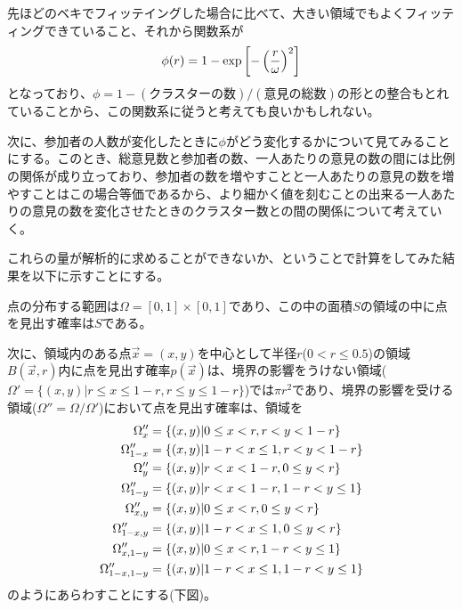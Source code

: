 \documentclass[letterpaper,10pt,english]{sphinxmanual}
\begin{document}
先ほどのベキでフィッテイングした場合に比べて、大きい領域でもよくフィッティングできていること、それから関数系が
\begin{gather}
\begin{split}\phi (r) = 1 - \exp \left[ -  \left( \frac{r}{\omega} \right)^{2} \right]\end{split}\notag
\end{gather}
となっており、\(\phi = 1- (\text{クラスターの数})/(\text{意見の総数})\)の形との整合もとれていることから、この関数系に従うと考えても良いかもしれない。

次に、参加者の人数が変化したときに\(\phi\)がどう変化するかについて見てみることにする。このとき、総意見数と参加者の数、一人あたりの意見の数の間には比例の関係が成り立っており、参加者の数を増やすことと一人あたりの意見の数を増やすことはこの場合等価であるから、より細かく値を刻むことの出来る一人あたりの意見の数を変化させたときのクラスター数との間の関係について考えていく。

これらの量が解析的に求めることができないか、ということで計算をしてみた結果を以下に示すことにする。

点の分布する範囲は\(\Omega = [0,1]\times [0,1]\)であり、この中の面積\(S\)の領域の中に点を見出す確率は\(S\)である。

次に、領域内のある点\(\vec x=(x,y)\)を中心として半径\(r\)(\(0 < r \le 0.5\))の領域\(B(\vec x, r)\)内に点を見出す確率\(p(\vec x)\)は、境界の影響をうけない領域(\(\Omega ' = \{(x,y) | r \le x \le 1-r, r \le y \le 1-r \}\))では\(\pi r^{2}\)であり、境界の影響を受ける領域(\(\Omega'' = \Omega / \Omega'\))において点を見出す確率は、領域を
\begin{gather}
\begin{split}\begin{align}
\Omega''_{x} &= \{(x,y) | 0 \le x < r, r< y < 1-r\} \\
\Omega''_{1-x} &= \{(x,y) | 1-r < x \le 1, r< y < 1-r\} \\
\Omega''_{y} &= \{(x,y) | r < x < 1-r, 0 \le y < r\} \\
\Omega''_{1-y} &= \{(x,y) | r < x < 1-r, 1-r < y \le 1\} \\
\Omega''_{x,y} &= \{(x,y) | 0 \le x < r, 0 \le y < r\} \\
\Omega''_{1-x,y} &= \{(x,y) | 1-r < x \le 1, 0 \le y < r\} \\
\Omega''_{x,1-y} &= \{(x,y) | 0 \le x < r, 1-r < y \le 1\} \\
\Omega''_{1-x, 1-y} &= \{(x,y) | 1-r < x \le 1, 1-r < y \le 1\}
\end{align}\end{split}\notag
\end{gather}
のようにあらわすことにする(下図)。
\end{document}
